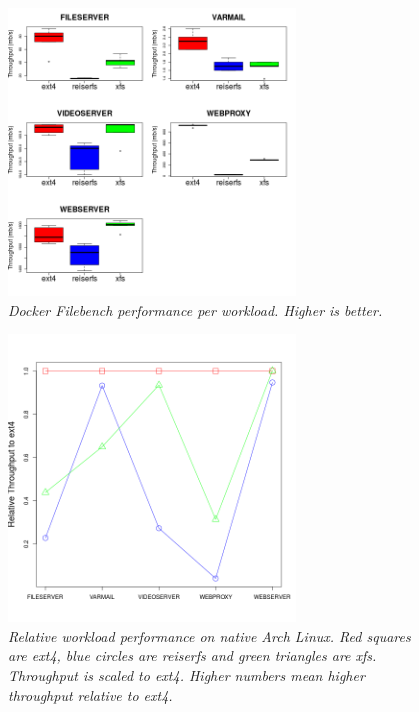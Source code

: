\documentclass[letterpaper,twocolumn,10pt]{article}
\begin{document}
\begin{figure}[!ht]
\centering
\includegraphics[width=3in]{../results/dock_workload_boxplots.png}
\caption{\textit{Docker Filebench performance per workload. Higher is better.}}
\label{fig:dock_workload_boxplots}
\end{figure}

\begin{figure}[!ht]
\centering
\includegraphics[width=3in]{../results/arch_relative_performance.png}
\caption{\textit{Relative workload performance on native Arch Linux. Red squares are ext4, blue circles are reiserfs and green triangles are xfs. Throughput is scaled to ext4. Higher numbers mean higher throughput relative to ext4.}}
\label{fig:arch_relative_performance}
\end{figure}
\end{document}
